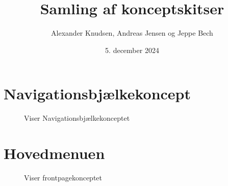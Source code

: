 \documentclass[12pt, a4paper]{article}
\date{5. december 2024}
\title{Samling af konceptskitser}
\author{Alexander Knudsen, Andreas Jensen og Jeppe Bech}
\begin{document}
\maketitle
\section{Navigationsbjælkekoncept}
\begin{figure}[H]
    \centering
    \caption{Viser Navigationsbjælkekonceptet}
\end{figure}

\section{Hovedmenuen}
\begin{figure}[H]
    \centering
    \caption{Viser frontpagekonceptet}
\end{figure}
\end{document}
